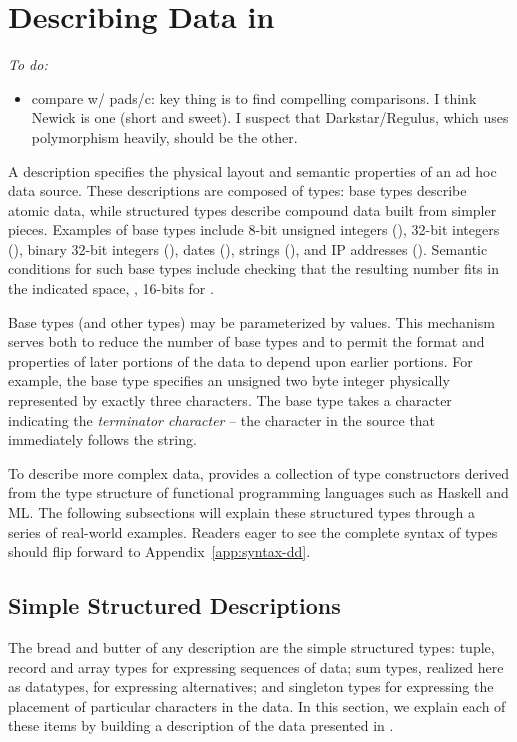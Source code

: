 \newcommand{\pvalue}{???}
\section{Describing Data in \padsmlbig{}}
\label{sec:padsml-overview}

{\em
To do:
\begin{itemize}
\item compare w/ pads/c: key thing is to find compelling
  comparisons. I think Newick is one (short and sweet). I suspect that
  Darkstar/Regulus, which uses polymorphism heavily, should be the other.
\end{itemize}
}

A \padsml{} description specifies the physical layout and semantic
properties of an ad hoc data source.  
These descriptions are composed of types: 
base types describe atomic data, while structured
types describe compound data built from simpler pieces.  Examples of
base types include 8-bit unsigned integers (), 32-bit
integers (), binary 32-bit integers (), dates
(), strings (), and IP addresses ().
Semantic conditions for such base types include checking that the
resulting number fits in the indicated space, \ie, 16-bits for
.

Base types (and other types) may be parameterized by values.  This
mechanism serves both to reduce the number of base types and to permit
the format and properties of later portions of the data to depend upon
earlier portions.  For example, the base type 
specifies an unsigned two byte integer physically represented by
exactly three characters. The base type  takes 
a character indicating the \textit{terminator character} -- the character in the
source that immediately follows the string. 

To describe more complex data, \padsml{} provides a collection of
type constructors derived from the type structure of functional
programming languages such as Haskell and ML.  The following
subsections will explain these structured types through a series 
of real-world examples.  Readers eager to see the complete syntax
of types should flip forward to Appendix~\ref{app:syntax-dd}.

\subsection{Simple Structured Descriptions}

The bread and butter of any \padsml{} description are the simple
structured types: tuple, record and array types for expressing
sequences of data; sum types, realized here as datatypes, for
expressing alternatives; and singleton types for expressing the
placement of particular characters in the data.  In this section, we
explain each of these items by building a description of the
\dibbler{} data presented in .

